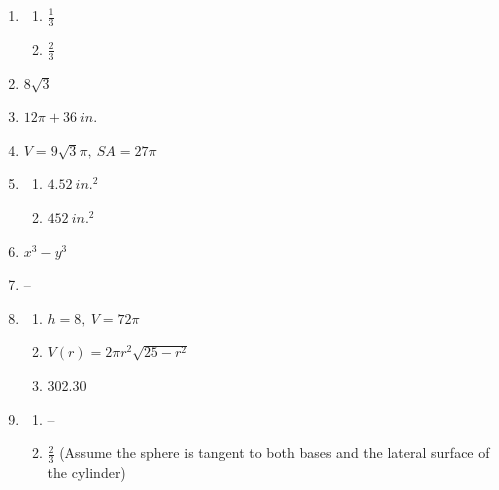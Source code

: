 \documentclass{article}
\begin{document}
\begin{enumerate}
\item 

	\begin{enumerate}
	
	\item $\frac{1}{3}$
	
	\item $\frac{2}{3}$
	
	\end{enumerate}
	
\item $8 \sqrt{3}$

\item $12 \pi + 36 \ in.$

\item $V = 9 \sqrt{3} \pi, \ SA = 27 \pi$

\item 

	\begin{enumerate}
	
	\item $4.52 \ in.^2$
	
	\item $452 \ in.^2$
	
	\end{enumerate}
	
\item $x^3 - y^3$

\item --
	
\item

	\begin{enumerate}
	
	\item $h = 8, \ V = 72 \pi$
	
	\item $V(r) = 2 \pi r^2 \sqrt{25 - r^2}$
	
	\item 302.30
	
	\end{enumerate}
	
\item

	\begin{enumerate}
	
	\item --
	
	\item $\frac{2}{3}$ (Assume the sphere is tangent to both bases and the lateral surface of the cylinder)
	
	\end{enumerate}
	

\end{enumerate}
\end{document}
